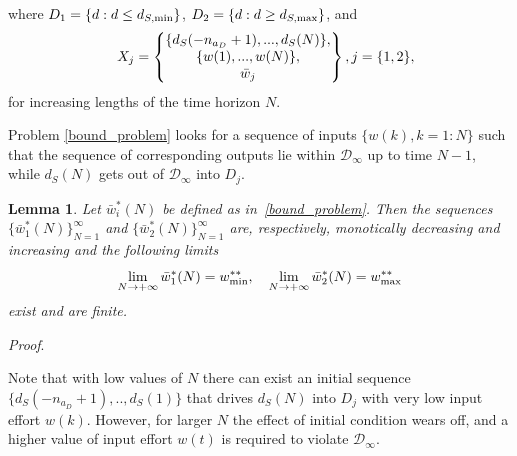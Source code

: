 \documentclass[letterpaper, 10 pt, conference]{ieeeconf}  %
\newtheorem{lemma}{Lemma}
\newcommand{\AB}[1]{\textbf{\color{magenta}{[AB: #1]}}}
\newcommand{\SK}[1]{\textbf{\color{blue}{[SK: #1]}}}
\begin{document}
	\normalsize
where $D_1 = \{d:d \leq d_{S,{\rm min}}\}$, $D_2 = \{d:d \geq d_{S,{\rm max}}\}$,
and
\begin{equation*}
\small 
X_j = 
	\begin{Bmatrix}
	\{d_S(-n_{a_D}+1),...,d_S(N)\},\\
	\{w(1),...,w(N)\},\vspace{0.001cm}\\
	\bar{w}_j
	\end{Bmatrix}, j=\{1,2\},
	\begin{matrix} 
	\end{matrix}
\end{equation*}
\normalsize
for increasing lengths of the time horizon $N$.

Problem \eqref{bound_problem} looks for a sequence of inputs $\{w(k), k={1:N}\}$ such that the sequence of corresponding outputs lie within $\mathcal{D}_{\infty}$
up to time $N-1$, while $d_S(N)$ gets out of $\mathcal{D}_{\infty}$ into $D_j$. 
\begin{lemma}
Let $\bar w_i^*(N)$ be defined as in~\eqref{bound_problem}. Then
the sequences $\{\bar w_1^*(N)\}_{N=1}^{\infty}$ and
$\{\bar w_2^*(N)\}_{N=1}^{\infty}$ are, respectively,
monotically decreasing and increasing and the following limits 
\[
    \lim_{N\rightarrow+\infty}\bar w_1^*(N)=w^{**}_{\rm min},\quad    \lim_{N\rightarrow+\infty}\bar w_2^*(N)=w^{**}_{\rm max}
\]
exist and are finite.
\end{lemma}
\emph{Proof}.
\AB{TBC}
\hfill\QED \\
\SK{Should there be a proof for Lemma 1? I am not sure if I can come up with one before the deadline}

Note that with low values of $N$ there can exist an initial sequence $\{d_S(-n_{a_D}+1),..,d_S(1)\}$ that drives $d_S(N)$ into $D_j$ with very low input effort $w(k)$. However, for larger $N$ the effect of initial condition wears off, and a higher value of input effort $w(t)$ is required to violate $\mathcal{D}_{\infty}$. 
\end{document}
